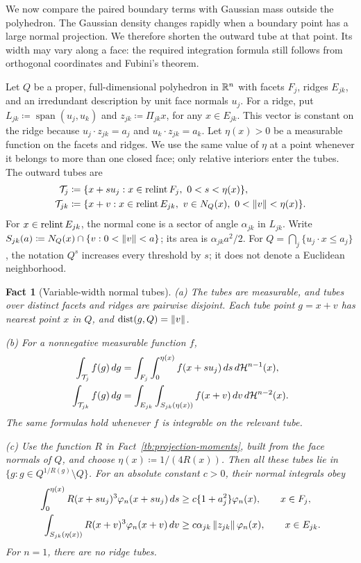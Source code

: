 \documentclass[11pt,letterpaper]{article}
\theoremstyle{plain}
\newtheorem{fact}{Fact}[section]
\begin{document}
We now compare the paired boundary terms with Gaussian mass outside
the polyhedron. The Gaussian density changes rapidly when a boundary point has a large
normal projection. We therefore shorten the outward tube at that point.
Its width may vary along a face: the required integration formula still
follows from orthogonal coordinates and Fubini's theorem.

Let \(Q\) be a proper, full-dimensional polyhedron in \(\mathbb R^n\) with
facets \(F_j\), ridges \(E_{jk}\), and an irredundant description by
unit face normals \(u_j\). For a ridge, put
\(L_{jk}\coloneqq \operatorname{span}(u_j,u_k)\) and
\(z_{jk}\coloneqq \Pi_{jk}x\), for any \(x\in E_{jk}\). This vector is constant
on the ridge because
\(u_j\cdot z_{jk}=a_j\) and \(u_k\cdot z_{jk}=a_k\).
Let \(\eta(x)>0\) be a measurable function on the facets and ridges.
We use the same value of \(\eta\) at a point whenever it belongs to
more than one closed face; only relative interiors enter the tubes.
The outward tubes are
\begin{align*}
 \mathcal T_j&\coloneqq \{x+s u_j:x\in\relint F_j,\ 0<s<\eta(x)\},\\
 \mathcal T_{jk}&\coloneqq \{x+v:x\in\relint E_{jk},\ v\in N_Q(x),\
                         0<\norm v<\eta(x)\}.
\end{align*}
For \(x\in\operatorname{relint} E_{jk}\), the normal cone is a sector of angle
\(\alpha_{jk}\) in \(L_{jk}\). Write
\(S_{jk}(a)\coloneqq N_Q(x)\cap\{v:0<\left\lVert v\right\rVert<a\}\); its area is
\(\alpha_{jk}a^2/2\). For \(Q=\bigcap_j\{u_j\cdot x\le a_j\}\),
the notation \(Q^s\) increases every threshold by \(s\); it does not
denote a Euclidean neighborhood.

\begin{fact}[Variable-width normal tubes]\label{tb:tubes}
(a) The tubes are measurable, and tubes over distinct facets and
ridges are pairwise disjoint.
Each tube point \(g=x+v\) has nearest point \(x\) in \(Q\), and
\(\operatorname{dist}(g,Q)=\left\lVert v\right\rVert\).

(b) For a nonnegative measurable function \(f\),
\begin{align*}
 \int_{\mathcal T_j}f(g)\,dg
 &=\int_{F_j}\int_0^{\eta(x)} f(x+s u_j)\,ds\,d\mathcal H^{n-1}(x),\\
 \int_{\mathcal T_{jk}}f(g)\,dg
 &=\int_{E_{jk}}\int_{S_{jk}(\eta(x))}f(x+v)\,dv\,d\mathcal H^{n-2}(x).
\end{align*}
The same formulas hold whenever \(f\) is integrable on the relevant tube.

(c) Use the function \(R\) in Fact~\ref{tb:projection-moments}, built
from the face normals of \(Q\), and choose \(\eta(x)\coloneqq 1/(4R(x))\).
Then all these tubes lie in \(\{g:g\in Q^{1/R(g)}\setminus Q\}\).
For an absolute constant \(c>0\), their normal integrals obey
\begin{align*}
 \int_0^{\eta(x)}R(x+s u_j)^3\varphi_n(x+s u_j)\,ds
 &\ge c\{1+a_j^2\}\varphi_n(x),\qquad x\in F_j,\\
 \int_{S_{jk}(\eta(x))}R(x+v)^3\varphi_n(x+v)\,dv
 &\ge c\alpha_{jk}\left\lVert z_{jk}\right\rVert\varphi_n(x),\qquad x\in E_{jk}.
\end{align*}
For \(n=1\), there are no ridge tubes.
\end{fact}
\end{document}
